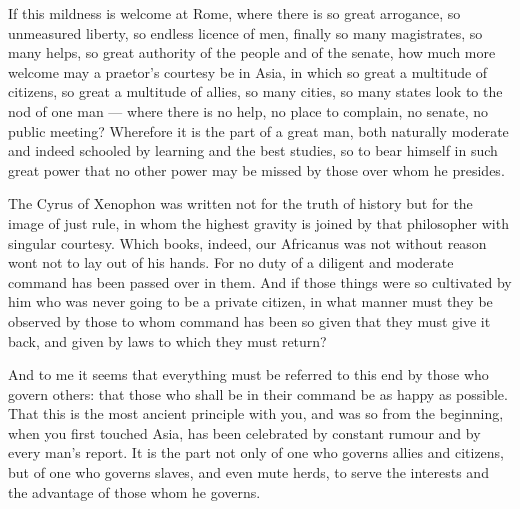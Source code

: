  If this mildness is welcome at Rome, where there is so great arrogance, so unmeasured liberty, so endless licence of men, finally so many magistrates, so many helps, so great authority of the people and of the senate, how much more welcome may a praetor's courtesy be in Asia, in which so great a multitude of citizens, so great a multitude of allies, so many cities, so many states look to the nod of one man --- where there is no help, no place to complain, no senate, no public meeting? Wherefore it is the part of a great man, both naturally moderate and indeed schooled by learning and the best studies, so to bear himself in such great power that no other power may be missed by those over whom he presides.

 The Cyrus of Xenophon was written not for the truth of history but for the image of just rule, in whom the highest gravity is joined by that philosopher with singular courtesy. Which books, indeed, our Africanus was not without reason wont not to lay out of his hands. For no duty of a diligent and moderate command has been passed over in them. And if those things were so cultivated by him who was never going to be a private citizen, in what manner must they be observed by those to whom command has been so given that they must give it back, and given by laws to which they must return?

 And to me it seems that everything must be referred to this end by those who govern others: that those who shall be in their command be as happy as possible. That this is the most ancient principle with you, and was so from the beginning, when you first touched Asia, has been celebrated by constant rumour and by every man's report. It is the part not only of one who governs allies and citizens, but of one who governs slaves, and even mute herds, to serve the interests and the advantage of those whom he governs.

